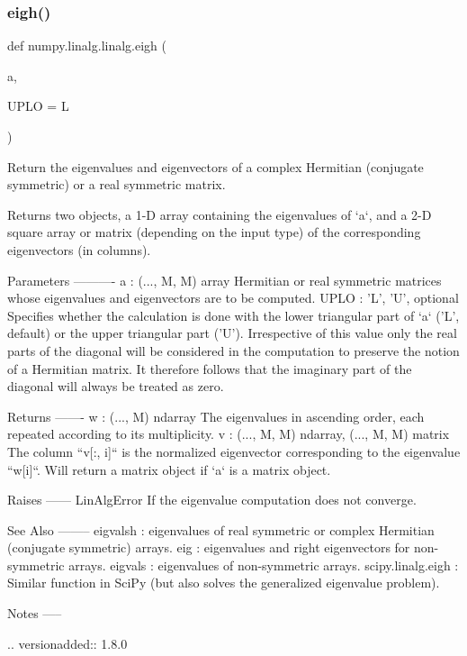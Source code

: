 \subsubsection{\texorpdfstring{eigh()}{eigh()}}
{\footnotesize\ttfamily def numpy.\+linalg.\+linalg.\+eigh (\begin{DoxyParamCaption}\item[{}]{a,  }\item[{}]{U\+P\+LO = {\ttfamily \textquotesingle{}L\textquotesingle{}} }\end{DoxyParamCaption})}

\begin{DoxyVerb}Return the eigenvalues and eigenvectors of a complex Hermitian
(conjugate symmetric) or a real symmetric matrix.

Returns two objects, a 1-D array containing the eigenvalues of `a`, and
a 2-D square array or matrix (depending on the input type) of the
corresponding eigenvectors (in columns).

Parameters
----------
a : (..., M, M) array
    Hermitian or real symmetric matrices whose eigenvalues and
    eigenvectors are to be computed.
UPLO : {'L', 'U'}, optional
    Specifies whether the calculation is done with the lower triangular
    part of `a` ('L', default) or the upper triangular part ('U').
    Irrespective of this value only the real parts of the diagonal will
    be considered in the computation to preserve the notion of a Hermitian
    matrix. It therefore follows that the imaginary part of the diagonal
    will always be treated as zero.

Returns
-------
w : (..., M) ndarray
    The eigenvalues in ascending order, each repeated according to
    its multiplicity.
v : {(..., M, M) ndarray, (..., M, M) matrix}
    The column ``v[:, i]`` is the normalized eigenvector corresponding
    to the eigenvalue ``w[i]``.  Will return a matrix object if `a` is
    a matrix object.

Raises
------
LinAlgError
    If the eigenvalue computation does not converge.

See Also
--------
eigvalsh : eigenvalues of real symmetric or complex Hermitian
           (conjugate symmetric) arrays.
eig : eigenvalues and right eigenvectors for non-symmetric arrays.
eigvals : eigenvalues of non-symmetric arrays.
scipy.linalg.eigh : Similar function in SciPy (but also solves the
                    generalized eigenvalue problem).

Notes
-----

.. versionadded:: 1.8.0


\end{DoxyVerb}

